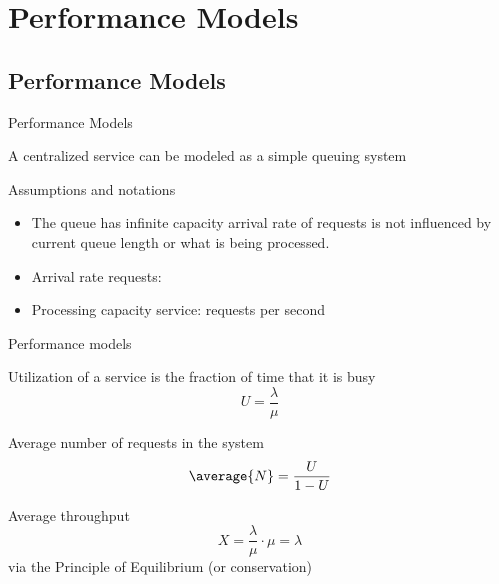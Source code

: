 \section{Performance Models}
\subsection{Performance Models}
\begin{frame}{Performance Models}
  \begin{block}{A centralized service can be modeled as a simple queuing system}
    \centering{}
  \end{block}
  \begin{block}{Assumptions and notations}
    \begin{itemize}\tightlist
      \item The queue has infinite capacity \mathexpr{\Rightarrow} arrival rate of requests is not influenced
            by current queue length or what is being processed.
      \item Arrival rate requests: \mathexpr{\lambda}
      \item Processing capacity service: \mathexpr{\mu} requests per second
    \end{itemize}
  \end{block}
\end{frame}
\begin{frame}{Performance models}
  \begin{block}{Utilization  of a service is the fraction of time that it is busy}
    \[ U = \frac{\lambda}{\mu} \]
  \end{block}
  \begin{block}{Average number of requests in the system}
    \[ \average{N} = \frac{U}{1-U} \]
  \end{block}
  \begin{block}{Average throughput}
    \[ X = \frac{\lambda}{\mu} \cdot \mu = \lambda \]
    via the Principle of Equilibrium (or conservation)
  \end{block}
\end{frame}
